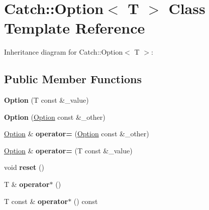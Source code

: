 \hypertarget{classCatch_1_1Option}{}\section{Catch\+:\+:Option$<$ T $>$ Class Template Reference}
\label{classCatch_1_1Option}


Inheritance diagram for Catch\+:\+:Option$<$ T $>$\+:
\subsection*{Public Member Functions}
\begin{DoxyCompactItemize}
\item 
{\bfseries Option} (T const \&\+\_\+value)\hypertarget{classCatch_1_1Option_a5aeb9c22d48a6882bdf5fb4730b06c86}{}\label{classCatch_1_1Option_a5aeb9c22d48a6882bdf5fb4730b06c86}

\item 
{\bfseries Option} (\hyperlink{classCatch_1_1Option}{Option} const \&\+\_\+other)\hypertarget{classCatch_1_1Option_af02f2e4559f06384baec0def8c68c5fd}{}\label{classCatch_1_1Option_af02f2e4559f06384baec0def8c68c5fd}

\item 
\hyperlink{classCatch_1_1Option}{Option} \& {\bfseries operator=} (\hyperlink{classCatch_1_1Option}{Option} const \&\+\_\+other)\hypertarget{classCatch_1_1Option_a78c65b15dd6b2fbd04c5012c43017c8f}{}\label{classCatch_1_1Option_a78c65b15dd6b2fbd04c5012c43017c8f}

\item 
\hyperlink{classCatch_1_1Option}{Option} \& {\bfseries operator=} (T const \&\+\_\+value)\hypertarget{classCatch_1_1Option_a2be7e343ab22d6061726d32ab4622653}{}\label{classCatch_1_1Option_a2be7e343ab22d6061726d32ab4622653}

\item 
void {\bfseries reset} ()\hypertarget{classCatch_1_1Option_a37b4e0e5d4d56296adacd267a616f4e0}{}\label{classCatch_1_1Option_a37b4e0e5d4d56296adacd267a616f4e0}

\item 
T \& {\bfseries operator$\ast$} ()\hypertarget{classCatch_1_1Option_afd989852fa453731c3190dac63caccb0}{}\label{classCatch_1_1Option_afd989852fa453731c3190dac63caccb0}

\item 
T const \& {\bfseries operator$\ast$} () const \hypertarget{classCatch_1_1Option_a0f05708905dc6b0b470fb24f5d265631}{}\label{classCatch_1_1Option_a0f05708905dc6b0b470fb24f5d265631}


\end{DoxyCompactItemize}
